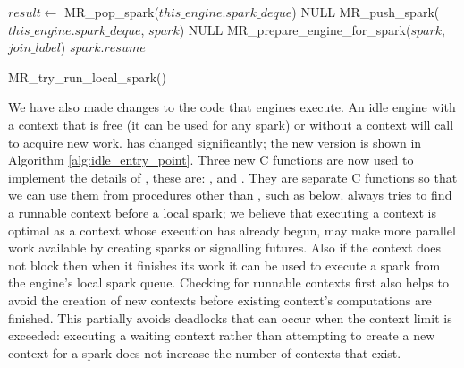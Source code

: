\begin{algorithm}[tbp]
\begin{algorithmic}
    \State $result \gets$ MR\_pop\_spark($this\_engine.spark\_deque$)
        \State \Return NULL
    \EndIf
        \State MR\_push\_spark($this\_engine.spark\_deque$, $spark$)
        \State \Return NULL
    \EndIf
    \State MR\_prepare\_engine\_for\_spark($spark$, $join\_label$)
    \State \Return $spark.resume$
\EndProcedure
\end{algorithmic}
\caption{MR\_try\_run\_local\_spark()}
\label{alg:try_run_local_spark}
\end{algorithm}

We have also made changes to the code that \idle engines execute.
An idle engine with a context that is free (it can be used for any spark) or
without a context will call \idle to acquire new work.
\idle has changed significantly;
the new version is shown in Algorithm \ref{alg:idle_entry_point}.
Three new C functions are now used to implement the details of \idle, these
are:
\tryruncontext, \tryrunlocalspark and \trystealspark.
They are separate C functions so that we can use them from procedures other
than \idle, such as \joinandcontinue below.
\idle always tries to find a runnable context before a local spark;
we believe that executing a context is optimal
as a context whose execution has already begun,
may make more parallel work available by creating sparks or signalling
futures.
Also if the context does not block then when it finishes its work it can be
used to execute a spark from the engine's local spark queue.
Checking for runnable contexts first also helps to avoid the creation of new
contexts before existing context's computations are finished.
This partially avoids deadlocks that can occur when the context limit is
exceeded:
executing a waiting context rather than attempting to create a new context
for a spark does not increase the number of contexts that exist.

